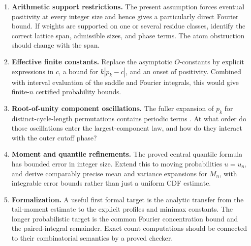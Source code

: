 \documentclass[11pt,letterpaper]{article}
\numberwithin{equation}{section}
\theoremstyle{remark}\newtheorem{remark}[theorem]{Remark}
\theoremstyle{definition}\newtheorem{definition}[theorem]{Definition}\theoremstyle{plain}
\begin{document}
\begin{enumerate}
\item\label{ncy:gb:q:arithmetic} \textbf{Arithmetic support restrictions.}
The present assumption forces eventual positivity at every
integer size and hence gives a particularly direct Fourier
bound. If weights are supported on one or several residue
classes, identify the correct lattice span, admissible sizes,
and phase terms. The atom obstruction should change with
the span.

\item\label{ncy:gb:q:effective} \textbf{Effective finite constants.}
Replace the asymptotic \(O\)-constants by explicit expressions
in \(c\), a bound for \(k|p_k-c|\), and an onset of positivity.
Combined with interval evaluation of the saddle and Fourier
integrals, this would give finite-\(n\) certified probability
bounds.

\item\label{ncy:gb:q:periodic} \textbf{Root-of-unity component oscillations.}
The fuller expansion of \(p_k\) for distinct-cycle-length
permutations contains periodic terms \cite{hybrid}.
At what order do those oscillations enter the largest-component
law, and how do they interact with the outer cutoff phase?

\item\label{ncy:gb:q:quantiles} \textbf{Moment and quantile refinements.}
The proved central quantile formula has bounded error in
integer size. Extend this to moving probabilities \(u=u_n\),
and derive comparably precise mean and variance expansions
for \(M_n\), with integrable error bounds rather than just a
uniform CDF estimate.

\item\label{ncy:gb:q:formal} \textbf{Formalization.}
A useful first formal target is the analytic transfer from
the tail-moment estimate to the explicit profiles and minimax
constants. The longer probabilistic target is the common
Fourier concentration bound and the paired-integral
remainder. Exact count computations should be connected to
their combinatorial semantics by a proved checker.
\end{enumerate}
\end{document}
